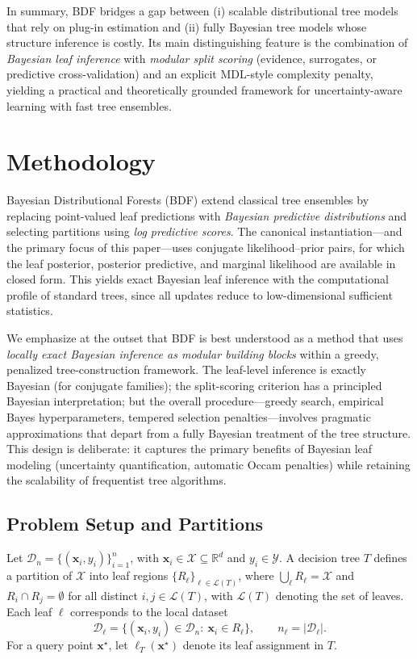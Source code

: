 \documentclass[twoside,11pt]{article}
\begin{document}
In summary, BDF bridges a gap between (i) scalable distributional tree models that rely on plug-in estimation and (ii) fully Bayesian tree models whose structure inference is costly. Its main distinguishing feature is the combination of \emph{Bayesian leaf inference} with \emph{modular split scoring} (evidence, surrogates, or predictive cross-validation) and an explicit MDL-style complexity penalty, yielding a practical and theoretically grounded framework for uncertainty-aware learning with fast tree ensembles.


\section{Methodology}\label{sec:methodology}

Bayesian Distributional Forests (BDF) extend classical tree ensembles by replacing point-valued leaf predictions with \emph{Bayesian predictive distributions} and selecting partitions using \emph{log predictive scores}. The canonical instantiation---and the primary focus of this paper---uses conjugate likelihood--prior pairs, for which the leaf posterior, posterior predictive, and marginal likelihood are available in closed form. This yields exact Bayesian leaf inference with the computational profile of standard trees, since all updates reduce to low-dimensional sufficient statistics.

We emphasize at the outset that BDF is best understood as a method that uses \emph{locally exact Bayesian inference as modular building blocks} within a greedy, penalized tree-construction framework. The leaf-level inference is exactly Bayesian (for conjugate families); the split-scoring criterion has a principled Bayesian interpretation; but the overall procedure---greedy search, empirical Bayes hyperparameters, tempered selection penalties---involves pragmatic approximations that depart from a fully Bayesian treatment of the tree structure. This design is deliberate: it captures the primary benefits of Bayesian leaf modeling (uncertainty quantification, automatic Occam penalties) while retaining the scalability of frequentist tree algorithms.

\subsection{Problem Setup and Partitions}

Let $\mathcal{D}_n = \{(\mathbf{x}_i, y_i)\}_{i=1}^n$, with $\mathbf{x}_i \in \mathcal{X}\subseteq \mathbb{R}^d$ and $y_i \in \mathcal{Y}$.
A decision tree $T$ defines a partition of $\mathcal{X}$ into leaf regions $\{R_\ell\}_{\ell\in\mathcal{L}(T)}$, where $\bigcup_{\ell} R_\ell = \mathcal X$ and $R_i \cap R_j = \emptyset$ for all distinct $i, j \in \mathcal L(T)$, with $\mathcal{L}(T)$ denoting the set of leaves.
Each leaf $\ell$ corresponds to the local dataset
\[
\mathcal{D}_\ell = \{(\mathbf{x}_i, y_i)\in \mathcal{D}_n:\ \mathbf{x}_i\in R_\ell\},
\qquad n_\ell = |\mathcal{D}_\ell|.
\]
For a query point $\mathbf{x}^\star$, let $\ell_T(\mathbf{x}^\star)$ denote its leaf assignment in $T$.
\end{document}
